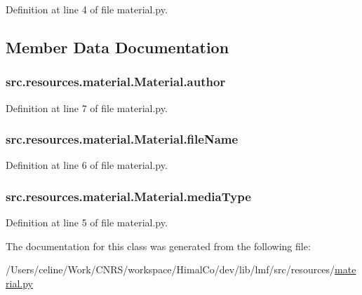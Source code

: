 Definition at line 4 of file material.\+py.



\subsection{Member Data Documentation}
\hypertarget{classsrc_1_1resources_1_1material_1_1_material_a481f2b82f2fda15566b03d0d46daff53}{
\subsubsection[{author}]{\setlength{\rightskip}{0pt plus 5cm}src.\+resources.\+material.\+Material.\+author}}\label{classsrc_1_1resources_1_1material_1_1_material_a481f2b82f2fda15566b03d0d46daff53}


Definition at line 7 of file material.\+py.

\hypertarget{classsrc_1_1resources_1_1material_1_1_material_ae70ad8b49785fe35dba81e544501e83d}{
\subsubsection[{file\+Name}]{\setlength{\rightskip}{0pt plus 5cm}src.\+resources.\+material.\+Material.\+file\+Name}}\label{classsrc_1_1resources_1_1material_1_1_material_ae70ad8b49785fe35dba81e544501e83d}


Definition at line 6 of file material.\+py.

\hypertarget{classsrc_1_1resources_1_1material_1_1_material_a35db3f075a5181c69216cace9731e0b7}{
\subsubsection[{media\+Type}]{\setlength{\rightskip}{0pt plus 5cm}src.\+resources.\+material.\+Material.\+media\+Type}}\label{classsrc_1_1resources_1_1material_1_1_material_a35db3f075a5181c69216cace9731e0b7}


Definition at line 5 of file material.\+py.



The documentation for this class was generated from the following file\+:\begin{DoxyCompactItemize}
\item 
/\+Users/celine/\+Work/\+C\+N\+R\+S/workspace/\+Himal\+Co/dev/lib/lmf/src/resources/\hyperlink{material_8py}{material.\+py}\end{DoxyCompactItemize}
